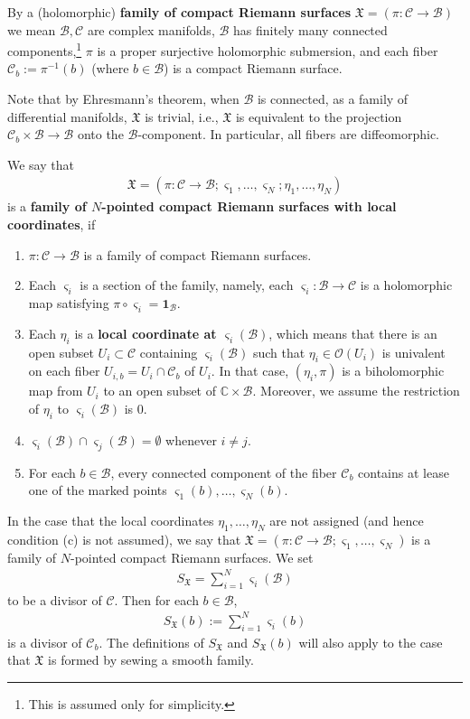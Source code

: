 \documentclass[12pt,a4paper,notitlepage]{article}
\theoremstyle{definition}
\theoremstyle{plain}
\newcommand{\fk}{\mathfrak}
\newcommand{\mc}{\mathcal}
\newcommand{\id}{\mathbf{1}}
\newcommand{\scr}{\mathscr}
\newcommand{\sgm}{\varsigma}
\newcommand{\SX}{S_{\fk X}}
\newcommand{\blt}{\bullet}
\newcommand{\Cbb}{\mathbb C}
\numberwithin{equation}{section}
\begin{document}
By  a (holomorphic) \textbf{family of compact Riemann surfaces} $\fk X=(\pi:\mc C\rightarrow\mc B)$ we mean $\mc B,\mc C$ are complex manifolds, $\mc B$ has finitely many connected components,\footnote{This is assumed only for simplicity.} $\pi$ is a proper surjective holomorphic submersion, and each fiber $\mc C_b:=\pi^{-1}(b)$ \index{Cb@$\mc C_b=\pi^{-1}(b)$} (where $b\in\mc B$) is a compact Riemann surface.

Note that by Ehresmann's theorem, when $\mc B$ is connected,  as a family of differential manifolds, $\fk X$  is trivial, i.e., $\fk X$ is equivalent to the projection $\mc C_b\times\mc B\rightarrow\mc B$ onto the $\mc B$-component. In particular, all fibers are diffeomorphic.



We say that
\begin{align*}
\fk X=(\pi:\mc C\rightarrow\mc B;\sgm_1,\dots,\sgm_N;\eta_1,\dots,\eta_N)
\end{align*}
is a \textbf{family of $N$-pointed compact Riemann surfaces with local coordinates}, if 
\begin{enumerate}[label=(\alph*)]
\item $\pi:\mc C\rightarrow\mc B$ is a family of compact Riemann surfaces.
\item Each $\sgm_i$ is a section of the family, namely, each $\sgm_i:\mc B\rightarrow\mc C$ is a holomorphic map satisfying $\pi\circ\sgm_i=\id_{\mc B}$.
\item Each $\eta_i$ is a \textbf{local coordinate at $\sgm_i(\mc B)$}, which means that there is an open subset $U_i\subset\mc C$ containing $\sgm_i(\mc B)$ such that $\eta_i\in\scr O(U_i)$ is univalent on each fiber $U_{i,b}=U_i\cap\mc C_b$ of $U_i$. In that case, $(\eta_i,\pi)$ is a biholomorphic map from $U_i$ to an open subset of $\Cbb\times\mc B$. Moreover, we assume the restriction of $\eta_i$ to $\sgm_i(\mc B)$ is $0$.
\item $\sgm_i(\mc B)\cap\sgm_j(\mc B)=\emptyset$ whenever $i\neq j$.
\item For each $b\in\mc B$, every connected component of the fiber $\mc C_b$ contains at lease one of the marked points $\sgm_1(b),\dots,\sgm_N(b)$.
\end{enumerate}
In the case that the local coordinates $\eta_1,\dots,\eta_N$ are not assigned (and hence condition (c) is not assumed), we say that $\fk X=(\pi:\mc C\rightarrow\mc B;\sgm_1,\dots,\sgm_N)$ is a family of $N$-pointed compact Riemann surfaces. \index{SX@$k\SX,\blt\SX$} We set
\begin{align*}
\SX=\sum_{i=1}^N\sgm_i(\mc B)
\end{align*}
to be a divisor of $\mc C$. Then for each $b\in\mc B$,
\begin{align*}
\SX(b):=\sum_{i=1}^N\sgm_i(b)
\end{align*}
is a divisor of $\mc C_b$. The definitions of $\SX$ and $\SX(b)$ will also apply to the case that $\fk X$ is formed by sewing a smooth family.
\end{document}
